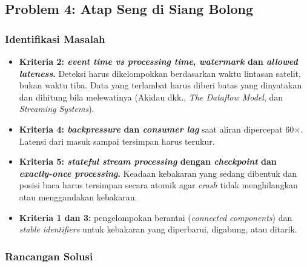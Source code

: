 \subsection{Problem 4: Atap Seng di Siang Bolong}

\subsubsection{Identifikasi Masalah}
\begin{itemize}
\item \textbf{Kriteria 2: \textit{event time vs processing time}, \textit{watermark} dan \textit{allowed lateness}.} Deteksi harus dikelompokkan berdasarkan waktu lintasan satelit, bukan waktu tiba. Data yang terlambat harus diberi batas yang dinyatakan dan dihitung bila melewatinya (Akidau dkk., \textit{The Dataflow Model}, dan \textit{Streaming Systems}).
\item \textbf{Kriteria 4: \textit{backpressure} dan \textit{consumer lag}} saat aliran dipercepat 60$\times$. Latensi dari masuk sampai tersimpan harus terukur.
\item \textbf{Kriteria 5: \textit{stateful stream processing} dengan \textit{checkpoint} dan \textit{exactly-once processing}.} Keadaan kebakaran yang sedang dibentuk dan posisi baca harus tersimpan secara atomik agar \textit{crash} tidak menghilangkan atau menggandakan kebakaran.
\item \textbf{Kriteria 1 dan 3:} pengelompokan berantai (\textit{connected components}) dan \textit{stable identifiers} untuk kebakaran yang diperbarui, digabung, atau ditarik.
\end{itemize}

\subsubsection{Rancangan Solusi}

